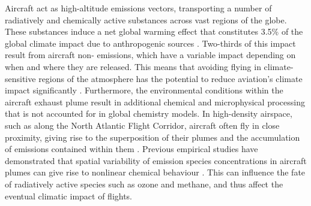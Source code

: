Aircraft act as high-altitude emissions vectors, transporting a number of radiatively and chemically active substances across vast regions of the globe. These substances induce a net global warming effect that constitutes 3.5\% of the global climate impact due to anthropogenic sources \cite{Lee2021}. Two-thirds of this impact result from aircraft non- emissions, which have a variable impact depending on when and where they are released. This means that avoiding flying in climate-sensitive regions of the atmosphere has the potential to reduce aviation's climate impact significantly \cite{Niklass2019a}. Furthermore, the environmental conditions within the aircraft exhaust plume result in additional chemical and microphysical processing that is not accounted for in global chemistry models. In high-density airspace, such as along the North Atlantic Flight Corridor, aircraft often fly in close proximity, giving rise to the superposition of their plumes and the accumulation of emissions contained within them \cite{Schlager1997}. Previous empirical studies have demonstrated that spatial variability of emission species concentrations in aircraft plumes can give rise to nonlinear chemical behaviour \cite{Paoli2011,Brasseur1998}. This can influence the fate of radiatively active species such as ozone and methane, and thus affect the eventual climatic impact of flights. %













